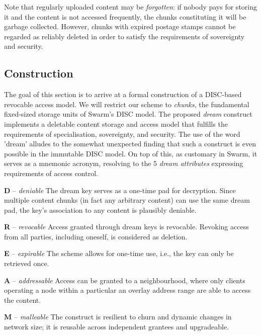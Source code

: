 Note that regularly uploaded content may be \emph{forgotten}: if nobody pays for storing it and the content is not accessed frequently, the chunks constituting it will be garbage collected. However, chunks with  expired postage stamps cannot be regarded as reliably deleted in order to satisfy the requirements of sovereignty and security. 


\subsection{Construction}

The goal of this section is to arrive at a formal construction of a DISC-based revocable access model. We will restrict our scheme to \emph{chunks}, the fundamental fixed-sized storage units of Swarm's DISC model.  The proposed \emph{dream} construct implements a  deletable content storage and access model that fulfills the requirements of specialisation, sovereignty, and security. The use of the word 'dream' alludes to the somewhat unexpected finding that such a construct is even possible in the immutable DISC model. On top of this, as customary in Swarm, it serves as a mnemonic acronym, resolving to the 5 \emph{dream attributes} expressing requirements of access control.

\begin{labelledlist}
    \item[\textbf{D} -- \emph{deniable}] The dream key serves as a one-time pad for decryption. Since multiple content chunks (in fact any arbitrary content) can use the same dream pad, the key's association to any content is plausibly deniable.
    \item[\textbf{R} -- \emph{revocable}] Access granted through  dream keys is revocable. Revoking access from all parties, including oneself, is considered as deletion.   
    \item[\textbf{E} -- \emph{expirable}] The scheme allows for one-time use, i.e., the key can only be retrieved once.
    \item[\textbf{A} -- \emph{addressable}] Access can be granted to a neighbourhood, where only clients operating a node within a particular an overlay address range are able to access the content.
    \item[\textbf{M} -- \emph{malleable}]  The construct is resilient to churn and dynamic changes in network size; it is reusable across independent grantees and upgradeable.
\end{labelledlist}

